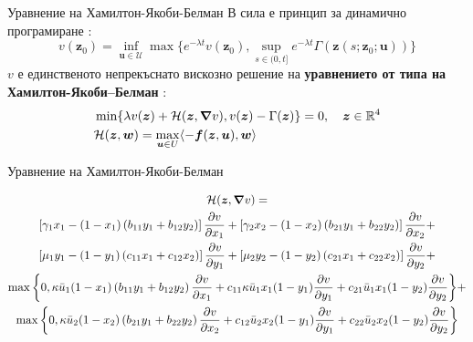 \begin{frame}[c]{Уравнение на Хамилтон-Якоби-Белман}
  В сила е принцип за динамично програмиране \cite{Zidani2013}:
  \begin{equation*}
    v(\boldsymbol{z}_0) = \inf_{\boldsymbol{u} \in \mathscr{U}} \max\{e^{-\lambda t} v(\boldsymbol{z}_0), \sup_{s \in (0, t]} e^{-\lambda t} \Gamma(\boldsymbol{z}(s; \boldsymbol{z}_0; \boldsymbol{u}))\}
  \end{equation*}
  $v$ е единственото непрекъснато вискозно решение на \textbf{уравнението от типа на Хамилтон-Якоби–Белман} \cite{Zidani2013}:
  \begin{equation}
    \begin{split}
      \label{eq:HJB}
      &\min\{\lambda v(\boldsymbol{z}) + \mathcal{H}(\boldsymbol{z}, \grad{v}), v(\boldsymbol{z}) - \Gamma(\boldsymbol{z}) \} = 0, \quad \boldsymbol{z} \in \mathbb{R}^4 \\
      &\mathcal{H}(\boldsymbol{z}, \boldsymbol{w}) = \max_{\boldsymbol{u} \in U} \langle -\boldsymbol{f}(\boldsymbol{z}, \boldsymbol{u}), \boldsymbol{w} \rangle
    \end{split}
  \end{equation}
\end{frame}

\begin{frame}[t]{Уравнение на Хамилтон-Якоби-Белман}
\begin{footnotesize}
  \begin{multline*}
    \label{eq:HamiltonianShort}
    \mathcal{H}(\boldsymbol{z}, \grad{v}) = \\
    \left[\gamma_1 x_1 - (1-x_1) \left(b_{11} y_1 + b_{12} y_2\right) \right] \pdv{v}{x_1} +
    \left[\gamma_2 x_2 - (1-x_2) \left(b_{21} y_1 + b_{22} y_2\right) \right] \pdv{v}{x_2} + \\
    \left[\mu_1 y_1 - (1-y_1) \left(c_{11} x_1 + c_{12} x_2\right) \right] \pdv{v}{y_1} +
    \left[\mu_2 y_2 - (1-y_2) \left(c_{21} x_1 + c_{22} x_2\right)\right] \pdv{v}{y_2} + \\
    \max\bigg\{0, \kappa \bar{u}_1 (1-x_1) \left(b_{11} y_1 + b_{12} y_2\right) \pdv{v}{x_1} + c_{11} \kappa \bar{u}_1 x_1 (1-y_1)\pdv{v}{y_1} + c_{21} \bar{u}_1 x_1 (1-y_2) \pdv{v}{y_2}
    \bigg\} + \\
    \max\bigg\{0, \kappa \bar{u}_2 (1-x_2) \left(b_{21} y_1 + b_{22} y_2\right) \pdv{v}{x_2} + c_{12} \bar{u}_2 x_2 (1-y_1)\pdv{v}{y_1} + c_{22}  \bar{u}_2 x_2 (1-y_2)\pdv{v}{y_2} \bigg\}
  \end{multline*}

  \end{footnotesize}
\end{frame}

